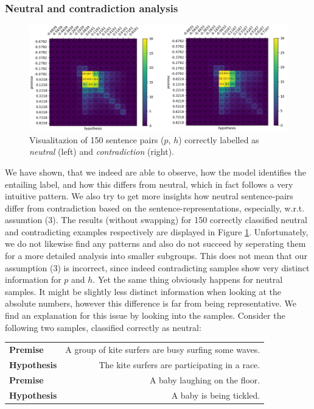 \subsubsection{Neutral and contradiction analysis}\label{sec:understanding_align_neutral_contr}
\begin{figure}[tph!]	\centering
\includegraphics[totalheight=7cm]{fig/neutr_contr_uninversed.png}
	\caption{Visualitazion of 150 sentence pairs ($p$, $h$) correctly labelled as \textit{neutral} (left) and \textit{contradiction} (right).}
	\label{fig:neutr_contr_uninversed}
\end{figure}
We have shown, that we indeed are able to observe, how the model identifies the entailing label, and how this differs from neutral, which in fact follows a very intuitive pattern. We also try to get more insights how neutral sentence-pairs  differ from contradiction based on the sentence-representations, especially, w.r.t. assumtion (3). The results (without swapping) for 150 correctly classified neutral and contradicting examples respectively are displayed in Figure \ref{fig:neutr_contr_uninversed}. Unfortunately, we do not likewise find any patterns and also do not succeed by seperating them for a more detailed analysis into smaller subgroups. This does not mean that our assumption (3) is incorrect, since indeed contradicting samples show very distinct information for $p$ and $h$. Yet the same thing obviously happens for neutral samples. It  might be slightly less distinct information when looking at the absolute numbers, however this difference is far from being representative. We find an explanation for this issue by looking into the samples. Consider the following two samples, classified correctly as neutral:
\begin{center}
\begin{tabular}{lr}
\textbf{Premise} & A group of kite surfers are busy surfing some waves. \\
\textbf{Hypothesis} & The kite surfers are participating in a race. \\
\midrule
\textbf{Premise} & A baby laughing on the floor. \\
\textbf{Hypothesis} & A baby is being tickled.
\end{tabular}
\end{center}
